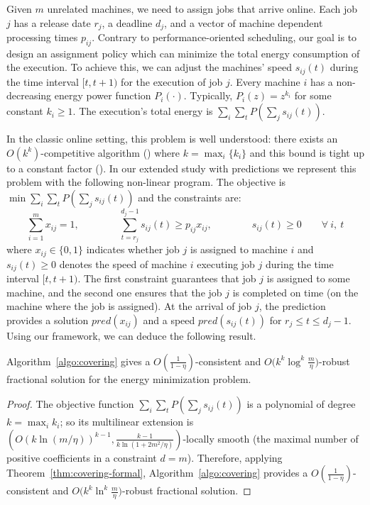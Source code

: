 Given $m$ unrelated machines, we need to assign jobs that arrive online. Each job $j$ has a release date $r_{j}$, a deadline $d_{j}$, and a vector of machine dependent processing times $p_{ij}$. Contrary to performance-oriented scheduling, our goal is to design an assignment policy which can minimize the total energy consumption of the execution. To achieve this, we can adjust the machines' speed $s_{ij}(t)$ during the time interval $[t,t+1)$ for the execution of job $j$. Every machine $i$ has a non-decreasing energy power function $P_{i}(\cdot)$. Typically, $P_{i}(z) = z^{k_{i}}$ for some constant $k_{i} \geq 1$. The execution's total energy is $\sum_{i} \sum_{t} P(\sum_{j} s_{ij}(t))$.

In the classic online setting, this problem is well understood: there exists an $O(k^{k})$-competitive algorithm (\cite{Thang20:Online-Primal-Dual}) where $k = \max_{i} \{k_{i}\}$
and this bound is tight up to a constant factor (\cite{Caragiannis08:Better-bounds}). In our extended study with predictions we represent this problem with the following non-linear program. The objective is $\min \sum_{i} \sum_{t} P(\sum_{j} s_{ij}(t))$ and the constraints are:
$$
\sum_{i=1}^{m} x_{ij} = 1,  \qquad \qquad \sum_{t = r_{j}}^{d_{j}-1} s_{ij}(t) \geq p_{ij} x_{ij}, \qquad  \qquad s_{ij}(t) \geq 0  \qquad \forall\ i,\ t
$$
where $x_{ij} \in \{0,1\}$ indicates whether job $j$ is assigned to machine $i$
and $s_{ij}(t) \geq 0$ denotes the speed of machine $i$ executing job $j$ during the time interval $[t, t+1)$.
The first constraint guarantees that job $j$ is assigned to some machine, and the second one ensures
that the job $j$ is completed on time (on the machine where the job is assigned). At the arrival of
job $j$, the prediction provides a solution $pred(x_{ij})$ and a speed $pred(s_{ij}(t))$ for $r_{j} \leq t \leq d_{j} - 1$.
Using our framework, we can deduce the following result.

\begin{proposition}
Algorithm~\ref{algo:covering} gives a
$O(\frac{1}{1 - \eta})$-consistent and $O\bigl(k^{k} \log^{k} \frac{m}{\eta}\bigr)$-robust fractional solution
for the energy minimization problem.
\end{proposition}
%
\begin{proof}
The objective function $\sum_{i} \sum_{t} P(\sum_{j} s_{ij}(t))$ is a polynomial of degree $k = \max_{i} k_{i}$;
so its multilinear extension is
$(O(k \ln(m/\eta))^{k-1}, \frac{k-1}{k \ln(1 + 2m^{2}/\eta)})$-locally smooth
(the maximal number of positive coefficients in a constraint $d = m$).
Therefore, applying Theorem~\ref{thm:covering-formal},
Algorithm~\ref{algo:covering} provides a $O(\frac{1}{1 - \eta})$-consistent and $O\bigl(k^{k} \ln^{k} \frac{m}{\eta}\bigr)$-robust
fractional solution.
\end{proof}




